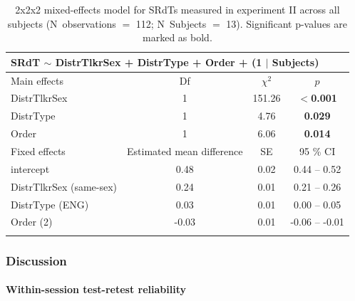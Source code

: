 \documentclass[a4paper, twoside]{templates/ociamthesis}
\begin{document}
\begin{table}[ht]
\center
\caption{\label{tab:Exp2_LMEM}{2x2x2 mixed-effects model for SRdTs measured in experiment II across all subjects (N~observations $=$ 112; N~Subjects $=$ 13). Significant p-values are marked as bold.}}
\renewcommand{\arraystretch}{2}
\begin{tabular}{lccc}
\hline \hline
\multicolumn{4}{l}{SRdT $\sim$ DistrTlkrSex + DistrType + Order + (1 $\mid$ Subjects)} \\ \hline
Main effects          & Df                        & $\chi^2$ & $p$             \\ \hline
DistrTlkrSex          & 1                         & 151.26   & \textbf{$<$0.001} \\
DistrType             & 1                         & 4.76     & \textbf{0.029}  \\ \hline
Order                   & 1                         & 6.06    & \textbf{0.014}  \\ \hline
Fixed effects         & Estimated mean difference & SE       & 95 \% CI        \\ \hline
intercept             & 0.48                      & 0.02     & 0.44 – 0.52     \\
DistrTlkrSex (same-sex)  & 0.24                      & 0.01     & 0.21 – 0.26     \\
DistrType  (ENG)  & 0.03                     & 0.01     & 0.00 – 0.05   \\
Order  (2)  & -0.03                     & 0.01     & -0.06 – -0.01   \\ \hline \hline
\\
\end{tabular}
\end{table}

\hypertarget{discussion-1}{%
\subsubsection{Discussion}\label{discussion-1}}

\hypertarget{within-session-test-retest-reliability-1}{%
\paragraph{Within-session test-retest reliability}\label{within-session-test-retest-reliability-1}}
\end{document}
